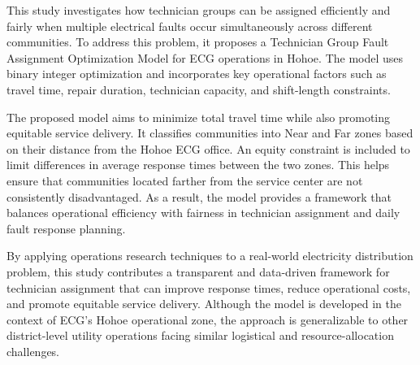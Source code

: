 \documentclass[11pt]{article}
\begin{document}
\vspace{0.25cm}
This study investigates how technician groups can be assigned efficiently and fairly when multiple electrical faults occur simultaneously across different communities. To address this problem, it proposes a Technician Group Fault Assignment Optimization Model for ECG operations in Hohoe. The model uses binary integer optimization and incorporates key operational factors such as travel time, repair duration, technician capacity, and shift-length constraints.

\vspace{0.25cm}

The proposed model aims to minimize total travel time while also promoting equitable service delivery. It classifies communities into Near and Far zones based on their distance from the Hohoe ECG office. An equity constraint is included to limit differences in average response times between the two zones. This helps ensure that communities located farther from the service center are not consistently disadvantaged. As a result, the model provides a framework that balances operational efficiency with fairness in technician assignment and daily fault response planning.

\vspace{0.25cm}
By applying operations research techniques to a real-world electricity distribution problem, this study contributes a transparent and data-driven framework for technician assignment that can improve response times, reduce operational costs, and promote equitable service delivery. Although the model is developed in the context of ECG’s Hohoe operational zone, the approach is generalizable to other district-level utility operations facing similar logistical and resource-allocation challenges.
\end{document}

